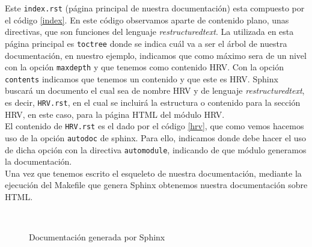 Este \texttt{index.rst} (página principal de nuestra documentación) esta compuesto por el código \ref{index}. En este código observamos aparte de contenido plano, unas directivas, que son funciones del lenguaje \textit{restructuredtext}. La utilizada en esta página principal es \texttt{toctree} donde se indica cuál va a ser el árbol de nuestra documentación, en nuestro ejemplo, indicamos que como máximo sera de un nivel con la opción \texttt{maxdepth} y que tenemos como contenido HRV. Con la opción \texttt{contents}  indicamos que tenemos un contenido y que este es HRV. Sphinx buscará un documento el cual sea de nombre HRV y de lenguaje \textit{restructuredtext}, es decir, \texttt{HRV.rst}, en el cual se incluirá la estructura o contenido para la sección HRV, en este caso, para la página HTML del módulo HRV. \\
El contenido de \texttt{HRV.rst} es el dado por el código \ref{hrv}, que como vemos hacemos uso de la opción \texttt{autodoc} de sphinx. Para ello, indicamos donde debe hacer el uso de dicha opción con la directiva \texttt{automodule}, indicando de que módulo generamos la documentación. \\

Una vez que tenemos escrito el esqueleto de nuestra documentación, mediante la ejecución del Makefile que genera Sphinx obtenemos nuestra documentación sobre HTML.

\begin{figure}[h!]
    \centering
    \\
    \caption{Documentación generada por Sphinx}
    \label{fig:sphinx}
\end{figure}

